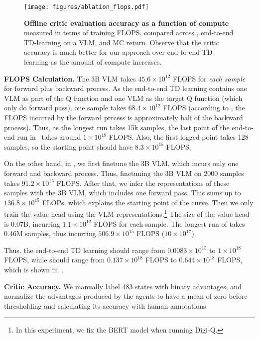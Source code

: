 \begin{wrapfigure}{r}{0.45\textwidth}
  \centering
  \texttt{[image: figures/ablation\_flops.pdf]}
  \caption{\textbf{Offline critic evaluation accuracy as a function of compute} measured in terms of training FLOPS, compared across \ourmethod{}, end-to-end TD-learning on a VLM, and MC return. Observe that the critic accuracy is much better for our approach over end-to-end TD-learning as the amount of compute increases.}
  \label{fig:flops}
  \vspace{-0.2cm}
\end{wrapfigure}

\textbf{FLOPS Calculation.} The 3B VLM takes $45.6\times10^{12}$ FLOPS for \textit{each sample} for forward plus backward process. As the end-to-end TD learning contains one VLM as part of the Q function and one VLM as the target Q function (which only do forward pass), one sample takes $68.4\times10^{12}$ FLOPS (according to \citet{hoffmann2022training}, the FLOPS incurred by the forward prrcess is approximately half of the backward process). Thus, as the longest run takes 15k samples, the last point of the end-to-end run in~ takes around $1\times10^{18}$ FLOPS. Also, the first logged point takes 128 samples, so the starting point should have $8.3\times10^{15}$ FLOPS.

On the other hand, in \ourmethod{}, we first finetune the 3B VLM, which incurs only one forward and backward process. Thus, finetuning the 3B VLM on $2000$ samples takes $91.2\times 10^{15}$ FLOPS. After that, we infer the representations of these samples with the 3B VLM, which includes one forward pass. This sums up to $136.8\times10^{15}$ FLOPs, which explains the starting point of the \ourmethod{} curve. Then we only train the value head using the VLM representations.\footnote{In this experiment, we fix the BERT model when running Digi-Q.} The size of the value head is 0.07B, incurring $1.1\times10^{12}$ FLOPS for each sample. The longest run of \ourmethod{} takes 0.46M samples, thus incurring $506.9\times 10^{15}$ FLOPS ($10\times 10^{17}$).

Thus, the end-to-end TD learning should range from $0.0083\times10^{15}$ to $1\times10^{18}$ FLOPS, while \ourmethod{} should range from $0.137\times10^{18}$ FLOPS to $0.644\times10^{18}$ FLOPS, which is shown in~.




\textbf{Critic Accuracy.} We manually label 483 states with binary advantages, and normalize the advantages produced by the agents to have a mean of zero before thresholding and calculating its accuracy with human annotations.

